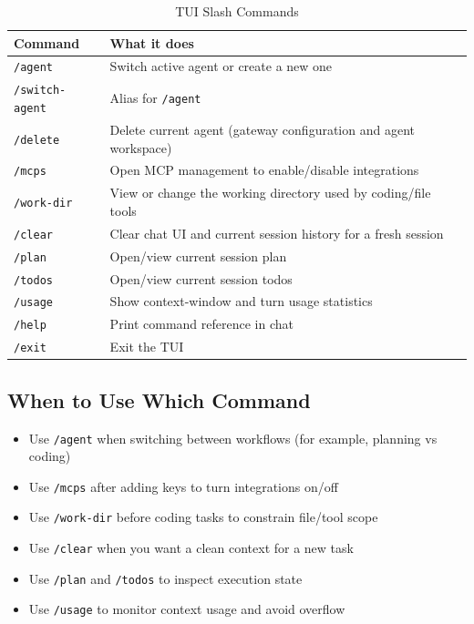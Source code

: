 \documentclass{article}
\begin{document}
\begin{table}[H]
\centering
\caption{TUI Slash Commands} \label{TblTUISlashCommands}
\begin{tabularx}{\textwidth}{lX}
\toprule
\textbf{Command} & \textbf{What it does} \\
\midrule
\texttt{/agent} & Switch active agent or create a new one \\
\texttt{/switch-agent} & Alias for \texttt{/agent} \\
\texttt{/delete} & Delete current agent (gateway configuration and agent workspace) \\
\texttt{/mcps} & Open MCP management to enable/disable integrations \\
\texttt{/work-dir} & View or change the working directory used by coding/file tools \\
\texttt{/clear} & Clear chat UI and current session history for a fresh session \\
\texttt{/plan} & Open/view current session plan \\
\texttt{/todos} & Open/view current session todos \\
\texttt{/usage} & Show context-window and turn usage statistics \\
\texttt{/help} & Print command reference in chat \\
\texttt{/exit} & Exit the TUI \\
\bottomrule
\end{tabularx}
\end{table}

\subsection{When to Use Which Command}

\begin{itemize}
	\item Use \texttt{/agent} when switching between workflows (for example, planning vs coding)
	\item Use \texttt{/mcps} after adding keys to turn integrations on/off
	\item Use \texttt{/work-dir} before coding tasks to constrain file/tool scope
	\item Use \texttt{/clear} when you want a clean context for a new task
	\item Use \texttt{/plan} and \texttt{/todos} to inspect execution state
	\item Use \texttt{/usage} to monitor context usage and avoid overflow
\end{itemize}
\end{document}
